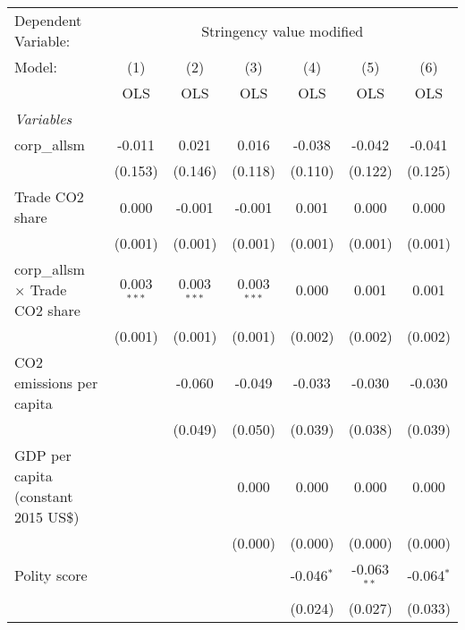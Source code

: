 
\begingroup
\centering
\begin{tabular}{lcccccc}
   \toprule
   Dependent Variable: & \multicolumn{6}{c}{Stringency value modified}\\
   Model:                                 & (1)           & (2)           & (3)           & (4)          & (5)           & (6)\\  
                                          &  OLS          & OLS           & OLS           & OLS          & OLS           & OLS\\  
   \midrule
   \emph{Variables}\\
   corp\_allsm                            & -0.011        & 0.021         & 0.016         & -0.038       & -0.042        & -0.041\\   
                                          & (0.153)       & (0.146)       & (0.118)       & (0.110)      & (0.122)       & (0.125)\\   
   Trade CO2 share                        & 0.000         & -0.001        & -0.001        & 0.001        & 0.000         & 0.000\\   
                                          & (0.001)       & (0.001)       & (0.001)       & (0.001)      & (0.001)       & (0.001)\\   
   corp\_allsm $\times$ Trade CO2 share   & 0.003$^{***}$ & 0.003$^{***}$ & 0.003$^{***}$ & 0.000        & 0.001         & 0.001\\   
                                          & (0.001)       & (0.001)       & (0.001)       & (0.002)      & (0.002)       & (0.002)\\   
   CO2 emissions per capita               &               & -0.060        & -0.049        & -0.033       & -0.030        & -0.030\\   
                                          &               & (0.049)       & (0.050)       & (0.039)      & (0.038)       & (0.039)\\   
   GDP per capita (constant 2015 US\$)    &               &               & 0.000         & 0.000        & 0.000         & 0.000\\   
                                          &               &               & (0.000)       & (0.000)      & (0.000)       & (0.000)\\   
   Polity score                           &               &               &               & -0.046$^{*}$ & -0.063$^{**}$ & -0.064$^{*}$\\   
                                          &               &               &               & (0.024)      & (0.027)       & (0.033)\\   

\end{tabular}
